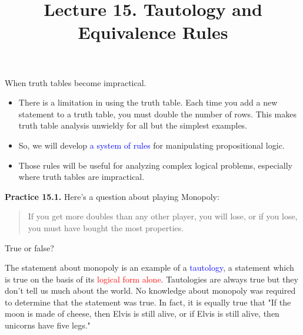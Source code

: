 \documentclass[aspectratio=169]{beamer}
\title{Lecture 15. Tautology and Equivalence Rules}
\date{ }
\providecommand{\Blue}[1]{\textcolor{blue}{#1}}
\providecommand{\Red}[1]{\textcolor{red}{#1}}
\begin{document}
\frame[plain]{\titlepage}

\begin{frame}[plain]{When truth tables become impractical.}
  
  \begin{itemize}
   \item There is a limitation in using the truth table. Each time you add a new statement to a truth table, 
      you must double the number of rows. This makes truth table analysis unwieldy for all but the simplest
      examples.
   \item So, we will develop \Blue{a system of rules} for manipulating 
       propositional logic. 
   \item   Those rules will be useful for analyzing complex logical problems, especially
       where truth tables are impractical.
  \end{itemize}

\end{frame}

\begin{frame}[plain]{}

    
 {\bf Practice 15.1.} Here's a question about playing Monopoly:
   \begin{quote}
     If you get more doubles than any other player, you will lose, 
     or if you lose, you must have bought the most properties.
   \end{quote}
     True or false?   
 \pause
 \medskip
 
 The statement about monopoly is an example of a \Blue{tautology}, 
 a statement which is true on the basis of its \Red{logical form alone}. 
 Tautologies are always true but they don't tell us much about the world. 
 No knowledge about monopoly was required to determine that the statement 
 was true. In fact, it is equally true that 
 "If the moon is made of cheese, then Elvis is
   still alive, or if Elvis is still alive, 
   then unicorns have five legs."

\vspace{.in}
 
 \end{frame}
\end{document}
